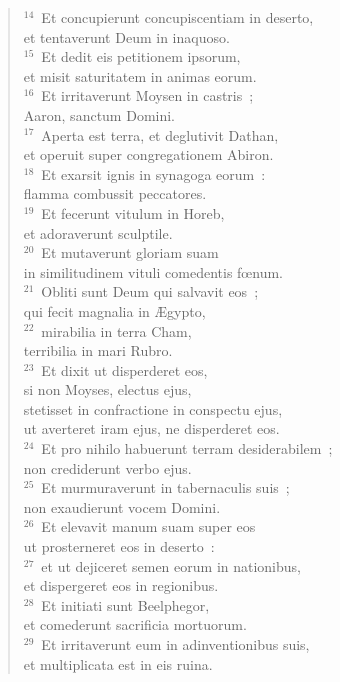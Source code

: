 \begin{flushleft}
\begin{verse}
${}^{14}$~Et concupierunt concupiscentiam in deserto,\\ et tentaverunt Deum in inaquoso.\\
${}^{15}$~Et dedit eis petitionem ipsorum,\\ et misit saturitatem in animas eorum.\\
${}^{16}$~Et irritaverunt Moysen in castris~;\\ Aaron, sanctum Domini.\\
${}^{17}$~Aperta est terra, et deglutivit Dathan,\\ et operuit super congregationem Abiron.\\
${}^{18}$~Et exarsit ignis in synagoga eorum~:\\ flamma combussit peccatores.\\
${}^{19}$~Et fecerunt vitulum in Horeb,\\ et adoraverunt sculptile.\\
${}^{20}$~Et mutaverunt gloriam suam\\ in similitudinem vituli comedentis fœnum.\\
${}^{21}$~Obliti sunt Deum qui salvavit eos~;\\ qui fecit magnalia in \AE gypto,\\
${}^{22}$~mirabilia in terra Cham,\\ terribilia in mari Rubro.\\
${}^{23}$~Et dixit ut disperderet eos,\\ si non Moyses, electus ejus,\\ stetisset in confractione in conspectu ejus,\\ ut averteret iram ejus, ne disperderet eos.\\
${}^{24}$~Et pro nihilo habuerunt terram desiderabilem~;\\ non crediderunt verbo ejus.\\
${}^{25}$~Et murmuraverunt in tabernaculis suis~;\\ non exaudierunt vocem Domini.\\
${}^{26}$~Et elevavit manum suam super eos\\ ut prosterneret eos in deserto~:\\
${}^{27}$~et ut dejiceret semen eorum in nationibus,\\ et dispergeret eos in regionibus.\\
${}^{28}$~Et initiati sunt Beelphegor,\\ et comederunt sacrificia mortuorum.\\
${}^{29}$~Et irritaverunt eum in adinventionibus suis,\\ et multiplicata est in eis ruina.\\

\end{verse}
\end{flushleft}
